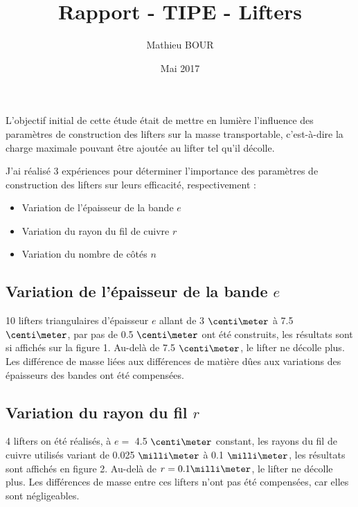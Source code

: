 \documentclass[french]{article}
\title{Rapport - TIPE - Lifters}
\author{Mathieu BOUR}
\date{Mai 2017}
\begin{document}
	\maketitle
	
	L'objectif initial de cette étude était de mettre en lumière l'influence des paramètres de construction des lifters sur la masse transportable, c'est-à-dire la charge maximale pouvant être ajoutée au lifter tel qu'il décolle.
	
	J'ai réalisé 3 expériences pour déterminer l'importance des paramètres de construction des lifters sur leurs efficacité, respectivement :
	\begin{itemize}
		\item Variation de l'épaisseur de la bande $e$
		\item Variation du rayon du fil de cuivre $r$
		\item Variation du nombre de côtés $n$
	\end{itemize}
	
	\subsection{Variation de l'épaisseur de la bande $e$}
	10 lifters triangulaires d'épaisseur $e$ allant de 3 $\centi\meter$ à 7.5 $\centi\meter$, par pas de 0.5 $\centi\meter$ ont été construits, les résultats sont si affichés sur la figure 1. Au-delà de 7.5 $\centi\meter$, le lifter ne décolle plus. Les différence de masse liées aux différences de matière dûes aux variations des épaisseurs des bandes ont été compensées.
	
	\subsection{Variation du rayon du fil $r$}
	4 lifters on été réalisés, à $e = $ 4.5 $\centi\meter$ constant, les rayons du fil de cuivre utilisés variant de 0.025 $\milli\meter$ à 0.1 $\milli\meter$, les résultats sont affichés en figure 2. Au-delà de $r = 0.1 \milli\meter$, le lifter ne décolle plus. Les différences de masse entre ces lifters n'ont pas été compensées, car elles sont négligeables.
	
	\pagebreak
\end{document}
